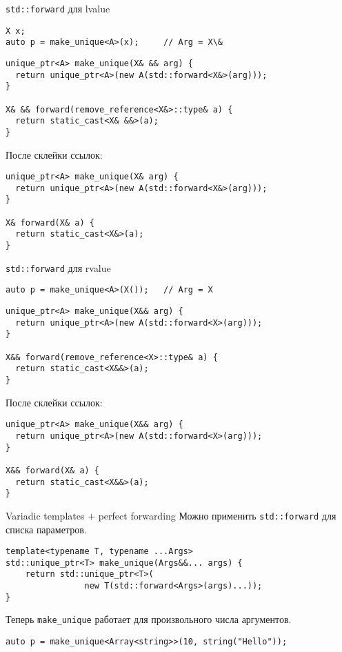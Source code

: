\documentclass[aspectration=1610,t]{beamer}
\begin{document}
\begin{frame}[fragile]{\texttt{std::forward} для lvalue}
\begin{lstlisting}
X x;
auto p = make_unique<A>(x); 	// Arg = X\&
\end{lstlisting}

\begin{lstlisting}
unique_ptr<A> make_unique(X& && arg) { 
  return unique_ptr<A>(new A(std::forward<X&>(arg)));
} 

X& && forward(remove_reference<X&>::type& a) {
  return static_cast<X& &&>(a);
} 
\end{lstlisting}
\pause
После склейки ссылок:
\begin{lstlisting}
unique_ptr<A> make_unique(X& arg) { 
  return unique_ptr<A>(new A(std::forward<X&>(arg)));
} 

X& forward(X& a) {
  return static_cast<X&>(a);
} 
\end{lstlisting}
\end{frame}

\begin{frame}[fragile]{\texttt{std::forward} для rvalue}
\begin{lstlisting}
auto p = make_unique<A>(X());	// Arg = X
\end{lstlisting}

\begin{lstlisting}
unique_ptr<A> make_unique(X&& arg) { 
  return unique_ptr<A>(new A(std::forward<X>(arg)));
} 

X&& forward(remove_reference<X>::type& a) {
  return static_cast<X&&>(a);
} 
\end{lstlisting}
\pause
После склейки ссылок:
\begin{lstlisting}
unique_ptr<A> make_unique(X&& arg) { 
  return unique_ptr<A>(new A(std::forward<X>(arg)));
} 

X&& forward(X& a) {
  return static_cast<X&&>(a);
} 
\end{lstlisting}

\end{frame}

\begin{frame}[fragile]{Variadic templates $+$ perfect forwarding}
Можно применить \texttt{std::forward} для списка параметров.
\begin{lstlisting}
template<typename T, typename ...Args> 
std::unique_ptr<T> make_unique(Args&&... args) {
    return std::unique_ptr<T>(
                new T(std::forward<Args>(args)...));
}
\end{lstlisting}
Теперь \texttt{make\_unique} работает для произвольного числа аргументов.
\begin{lstlisting}
auto p = make_unique<Array<string>>(10, string("Hello"));
\end{lstlisting}
\end{frame}
\end{document}
